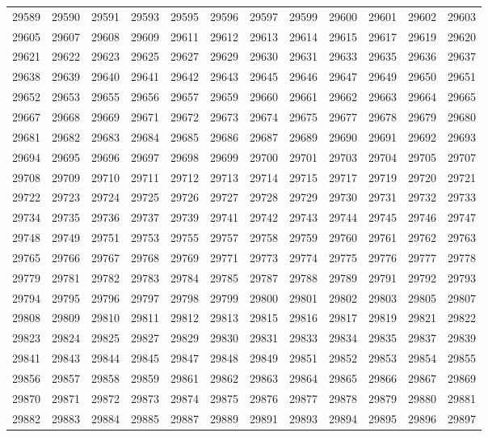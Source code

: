 \begin{center}
\begin{longtable}{llllllllllll}
29589 &29590 &29591 &29593 &29595 &29596 &29597 &29599 &29600 &29601 &29602 &29603 \\
29605 &29607 &29608 &29609 &29611 &29612 &29613 &29614 &29615 &29617 &29619 &29620 \\
29621 &29622 &29623 &29625 &29627 &29629 &29630 &29631 &29633 &29635 &29636 &29637 \\
29638 &29639 &29640 &29641 &29642 &29643 &29645 &29646 &29647 &29649 &29650 &29651 \\
29652 &29653 &29655 &29656 &29657 &29659 &29660 &29661 &29662 &29663 &29664 &29665 \\
29667 &29668 &29669 &29671 &29672 &29673 &29674 &29675 &29677 &29678 &29679 &29680 \\
29681 &29682 &29683 &29684 &29685 &29686 &29687 &29689 &29690 &29691 &29692 &29693 \\
29694 &29695 &29696 &29697 &29698 &29699 &29700 &29701 &29703 &29704 &29705 &29707 \\
29708 &29709 &29710 &29711 &29712 &29713 &29714 &29715 &29717 &29719 &29720 &29721 \\
29722 &29723 &29724 &29725 &29726 &29727 &29728 &29729 &29730 &29731 &29732 &29733 \\
29734 &29735 &29736 &29737 &29739 &29741 &29742 &29743 &29744 &29745 &29746 &29747 \\
29748 &29749 &29751 &29753 &29755 &29757 &29758 &29759 &29760 &29761 &29762 &29763 \\
29765 &29766 &29767 &29768 &29769 &29771 &29773 &29774 &29775 &29776 &29777 &29778 \\
29779 &29781 &29782 &29783 &29784 &29785 &29787 &29788 &29789 &29791 &29792 &29793 \\
29794 &29795 &29796 &29797 &29798 &29799 &29800 &29801 &29802 &29803 &29805 &29807 \\
29808 &29809 &29810 &29811 &29812 &29813 &29815 &29816 &29817 &29819 &29821 &29822 \\
29823 &29824 &29825 &29827 &29829 &29830 &29831 &29833 &29834 &29835 &29837 &29839 \\
29841 &29843 &29844 &29845 &29847 &29848 &29849 &29851 &29852 &29853 &29854 &29855 \\
29856 &29857 &29858 &29859 &29861 &29862 &29863 &29864 &29865 &29866 &29867 &29869 \\
29870 &29871 &29872 &29873 &29874 &29875 &29876 &29877 &29878 &29879 &29880 &29881 \\
29882 &29883 &29884 &29885 &29887 &29889 &29891 &29893 &29894 &29895 &29896 &29897 \\

\end{longtable}
\end{center}
